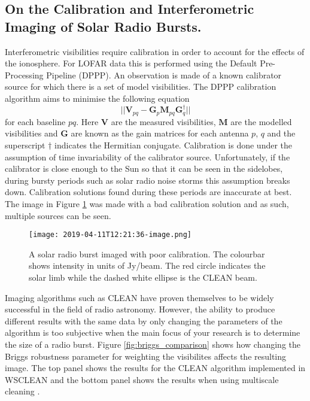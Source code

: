 \subsection{On the Calibration and Interferometric Imaging of Solar Radio Bursts.}
Interferometric visibilities require calibration in order to account for the effects of the ionosphere. For LOFAR data this is performed using the Default Pre-Processing Pipeline (DPPP). An observation is made of a known calibrator source for which there is a set of model visibilities. The DPPP calibration algorithm aims to minimise the following equation
\begin{equation}
\label{eq:gain}
\vert \vert \mathbf{V}_{pq} - \mathbf{G}_p \mathbf{M}_{pq} \mathbf{G}^\dag_q \vert \vert
\end{equation}
for each baseline $pq$. Here $\mathbf{V}$ are the measured visibilities, $\mathbf{M}$ are the modelled visibilities and $\mathbf{G}$ are known as the gain matrices for each antenna $p$, $q$ and the superscript $\dag$ indicates the Hermitian conjugate. Calibration is done under the assumption of time invariability of the calibrator source. Unfortunately, if the calibrator is close enough to the Sun so that it can be seen in the sidelobes, during bursty periods such as solar radio noise storms this assumption breaks down. Calibration solutions found during these periods are inaccurate at best. The image in Figure \ref{fig:bad_cal} was made with a bad calibration solution and as such, multiple sources can be seen.

\begin{figure}[ht]
\centering
\texttt{[image: 2019-04-11T12:21:36-image.png]}
\caption[An example of a solar radio burst imaged with poor calibration.]{A solar radio burst imaged with poor calibration. The colourbar shows intensity in units of Jy/beam. The red circle indicates the solar limb while the dashed white ellipse is the CLEAN beam.}
\label{fig:bad_cal}
\end{figure}

Imaging algorithms such as CLEAN have proven themselves to be widely successful in the field of radio astronomy. However, the ability to produce different results with the same data by only changing the parameters of the algorithm is too subjective when the main focus of your research is to determine the size of a radio burst. Figure \ref{fig:briggs_comparison} shows how changing the Briggs robustness parameter for weighting the visibilites \citep{Briggs1995} affects the resulting image. The top panel shows the results for the CLEAN algorithm implemented in WSCLEAN and the bottom panel shows the results when using multiscale cleaning \citep{Offringa2017}. 

